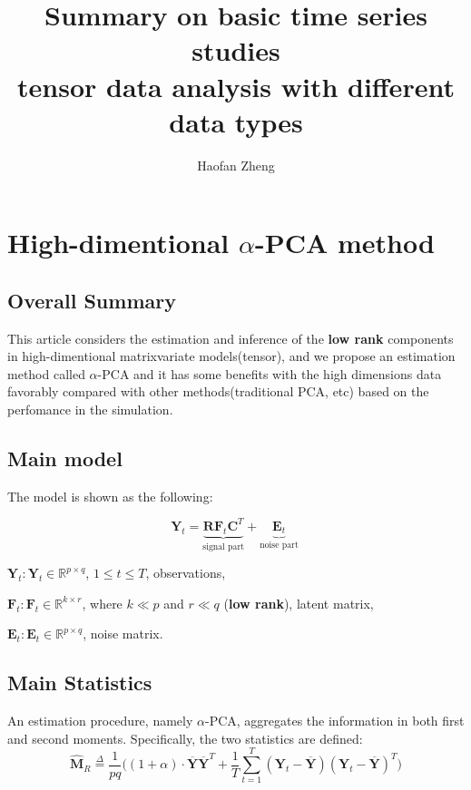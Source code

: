 \documentclass{article}[12pt]
\title{\textbf{Summary on basic time series studies\\ \large tensor data analysis with different data types}}
\author{Haofan Zheng}
\date{}
\begin{document}
\maketitle
\newpage
\tableofcontents
\newpage

\section{High-dimentional $\alpha$-PCA method}
\subsection{Overall Summary}
\noindent This article considers the estimation and inference of the \textbf{low rank} components in high-dimentional matrixvariate models(tensor), and we propose an estimation method called $\alpha$-PCA and it has some benefits with the high dimensions data favorably compared with other methods(traditional PCA, etc) based on the perfomance in the simulation.



\subsection{Main model}\label{section main model 1.2}
\noindent The model is shown as the following:

\begin{equation}
    \mathbf{Y}_t = \underbrace{\mathbf{R}\mathbf{F}_t\mathbf{C}^T}_\text{signal part}+ \underbrace{\mathbf{E}_t}_\text{noise part}\
    \label{expression main model 1.2}
\end{equation}


$\mathbf{Y}_t: \mathbf{Y}_t\in \mathbb{R}^{p\times q}$, $1\leq t \leq T$, observations,

$\mathbf{F}_t: \mathbf{F}_t\in \mathbb{R}^{k\times r}$, where $k\ll p$ and $r\ll q$ (\textbf{low rank}), latent matrix,

$\mathbf{E}_t: \mathbf{E}_t\in \mathbb{R}^{p \times q}$, noise matrix.

\subsection{Main Statistics}\label{main statistics 1.3}
\noindent An estimation procedure, namely $\alpha$-PCA, aggregates the information in both first and second moments. Specifically, the two statistics are defined:
\begin{equation}
    \mathbf{\widehat{M}}_R  \overset{\Delta}{=} \dfrac{1}{pq}\Bigg((1 + \alpha) \cdot \mathbf{\overline{Y}}\mathbf{\overline{Y}}^T + \dfrac{1}{T}\sum\limits_{t=1}^T(\mathbf{Y}_t - \mathbf{\overline{Y}})(\mathbf{Y}_t - \mathbf{\overline{Y}})^T\Bigg)
    \label{statistics MR 1.3}
\end{equation}
\end{document}
